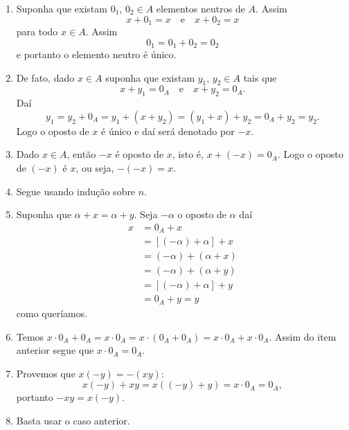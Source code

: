 \begin{prova}
    \begin{enumerate}[label={\roman*})]
        \item Suponha que existam $0_1$, $0_2\in A$ elementos neutros de $A$. Assim
        \[
            x + 0_1 = x \quad \mbox{e}\quad x + 0_2 = x
        \]
        para todo $x \in A$. Assim
        \[
            0_1 = 0_1 + 0_2 = 0_2
        \]
        e portanto o elemento neutro é único.

        \item De fato, dado $x \in A$ suponha que existam $y_1$, $y_2\in A$ tais que
        \[
            x + y_1 = 0_A \quad \mbox{e}\quad x + y_2 = 0_A.
        \]
        Daí
        \[
            y_1 = y_2 + 0_A = y_1 + (x + y_2) = (y_1 + x) + y_2 = 0_A + y_2 =y_2.
        \]
        Logo o oposto de $x$ é único  e daí será denotado por $-x$.

        \item Dado $x \in A$, então $-x$ é oposto de $x$, isto é, $x + (-x) = 0_A$. Logo o oposto de $(-x)$ é $x$, ou seja, $-(-x) = x$.

        \item Segue usando indução sobre $n$.

        \item Suponha que $\alpha + x = \alpha + y$. Seja $-\alpha$ o oposto de $\alpha$ daí
        \begin{align*}
            x &= 0_A + x \\ &= [(-\alpha) + \alpha] + x\\ &= (-\alpha) + (\alpha + x) \\ &= (-\alpha) + (\alpha + y) \\ &= [(-\alpha) + \alpha] + y \\ &= 0_A + y = y
        \end{align*}
        como queríamos.

        \item Temos $x\cdot 0_A + 0_A = x\cdot 0_A = x\cdot(0_A + 0_A) = x\cdot 0_A + x\cdot 0_A$. Assim do item anterior segue que $x\cdot 0_A = 0_A$.

        \item Provemos que $x(-y) = -(xy)$:
        \[
            x(-y) + xy = x((-y) + y) = x\cdot 0_A = 0_A,
        \]
        portanto $-xy = x(-y)$.

        \item Basta usar o caso anterior.
    \end{enumerate}
\end{prova}

